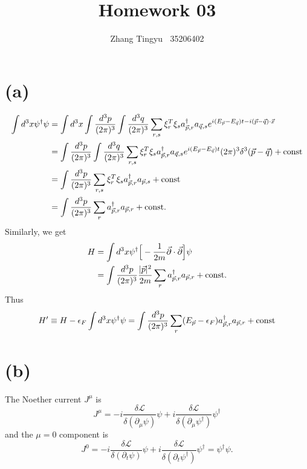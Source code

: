 \documentclass[12pt]{article}
\title{Homework 03}
\author{Zhang Tingyu $\ $ 35206402}
\begin{document}
\maketitle

\section*{(a)}

\begin{equation*}
    \begin{split}
        \int d^3x\psi^\dagger\psi&=\int d^3x\int\frac{d^3p}{(2\pi)^3}
        \int\frac{d^3q}{(2\pi)^3}\sum_{r,s}\xi^T_r\xi_sa^\dagger_{\vec{p},r}
        a_{\vec{q},s}e^{i(E_{\vec{p}}-E_{\vec{q}})t-i(\vec{p}-\vec{q})\cdot\vec{x}}\\
        &=\int\frac{d^3p}{(2\pi)^3}\int\frac{d^3q}{(2\pi)^3}\sum_{r,s}
        \xi^T_r\xi_sa^\dagger_{\vec{p},r}a_{\vec{q},s}e^{i(E_{\vec{p}}-E_{\vec{q}})t}
        (2\pi)^3\delta^3(\vec{p}-\vec{q})+{\rm const}\\
        &=\int\frac{d^3p}{(2\pi)^3}\sum_{r,s}\xi^T_r\xi_sa^\dagger_{\vec{p},r}
        a_{\vec{p},s}+{\rm const}\\
        &=\int\frac{d^3p}{(2\pi)^3}\sum_ra^\dagger_{\vec{p},r}a_{\vec{p},r}
        +{\rm const}.
    \end{split}
\end{equation*}
Similarly, we get 
\begin{equation*}
    \begin{split}
        H&=\int d^3x\psi^\dagger\Big[-\frac{1}{2m}\vec{\partial}\cdot\vec
        {\partial}\Big]\psi\\
        &=\int\frac{d^3p}{(2\pi)^3}\frac{|\vec{p}|^2}{2m}\sum_r
        a^\dagger_{\vec{p},r}a_{\vec{p},r}+{\rm const}.
    \end{split}
\end{equation*}
Thus
\begin{equation*}
    H'\equiv H-\epsilon_F\int d^3x\psi^\dagger\psi=\int\frac{d^3p}{(2\pi)^3}
    \sum_r(E_{\vec{p}}-\epsilon_F)a^\dagger_{\vec{p},r}a_{\vec{p},r}+{\rm const}
\end{equation*}

\section*{(b)}

The Noether current $J^\mu$ is 
\begin{equation*}
    J^\mu=-i\frac{\delta\mathcal{L}}{\delta(\partial_\mu\psi)}\psi+
    i\frac{\delta\mathcal{L}}{\delta(\partial_\mu\psi^\dagger)}\psi^\dagger
\end{equation*}
and the $\mu=0$ component is 
\begin{equation*}
    J^0=-i\frac{\delta\mathcal{L}}{\delta(\partial_t\psi)}\psi+i\frac
    {\delta\mathcal{L}}{\delta(\partial_t\psi^\dagger)}\psi^\dagger
    =\psi^\dagger\psi.
\end{equation*}
\end{document}
